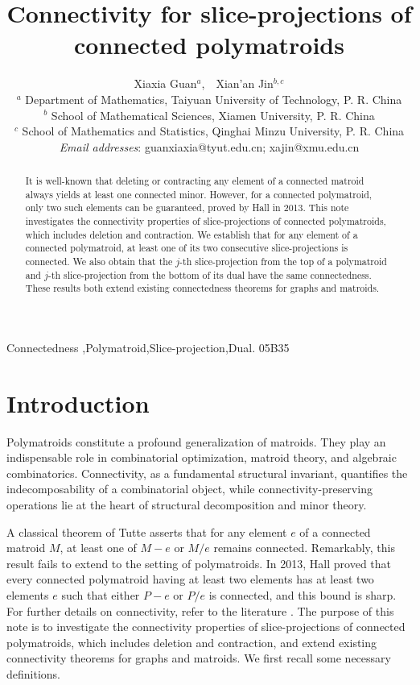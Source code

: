 \documentclass[preprint,10pt]{elsarticle}
\title{Connectivity for slice-projections of connected polymatroids}
\author{Xiaxia Guan$^{a}$,~~Xian'an Jin$^{b,c}$ \\
\small $^a$ Department of Mathematics, Taiyuan University of Technology, P. R. China\\
\small $^b$ School of Mathematical Sciences, Xiamen University, P. R. China\\
\small $^c$ School of Mathematics and Statistics, Qinghai Minzu University, P. R. China\\
\small \emph{Email addresses}: guanxiaxia@tyut.edu.cn; xajin@xmu.edu.cn}
\theoremstyle{plain}
\theoremstyle{definition}
\theoremstyle{remark}
\begin{document}
\begin{abstract}
It is well-known that deleting or contracting any element of a connected matroid always yields at least one connected minor. However, for a connected polymatroid, only two such elements can be guaranteed, proved by Hall in 2013. This note investigates the connectivity properties of slice-projections of connected polymatroids, which includes deletion and contraction. We establish that for any element of a connected polymatroid, at least one of its two consecutive slice-projections is connected. We also obtain that the $j$-th slice-projection from the top of a polymatroid and  $j$-th slice-projection from the bottom of its dual have the same connectedness. These results both extend existing connectedness theorems for graphs and matroids.
\end{abstract}

\begin{keyword}
Connectedness \sep Polymatroid\sep Slice-projection\sep Dual.
\MSC 05B35
\end{keyword}

\maketitle
\section{Introduction}
\noindent

Polymatroids constitute a profound generalization of matroids. They play an indispensable role in combinatorial optimization, matroid theory, and algebraic combinatorics.  Connectivity, as a fundamental structural invariant, quantifies the indecomposability of a combinatorial object, while connectivity-preserving operations lie at the heart of structural decomposition and minor theory.


A classical theorem of Tutte \cite{Tutte} asserts that for any element $e$ of a connected matroid $M$, at least one of $M-e$ or $M/e$ remains connected. Remarkably, this result fails to extend to the setting of polymatroids. In 2013, Hall \cite{Hall} proved that every connected polymatroid having at least  two elements has at least two elements $e$ such that either $P-e$ or $P/e$ is connected, and this bound is sharp. For further details on connectivity, refer to the literature \cite{Bonin,Oxley}. The purpose of this note is to investigate the connectivity properties of slice-projections of connected polymatroids, which includes deletion and contraction, and extend existing connectivity theorems for graphs and matroids. We first recall some necessary definitions.
\end{document}
